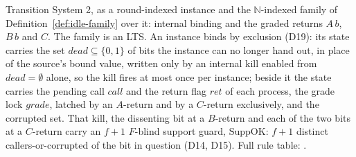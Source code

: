 \begin{definition}
  \label{def:aba-gbca-spec}
  \leanok
  Transition System 2, as a round-indexed instance and the $\mathbb{N}$-indexed family of Definition~\ref{def:idle-family} over it: internal binding and the graded returns $A\,b$, $B\,b$ and $C$.
  The family is an LTS.\leanok{}
  An instance binds by exclusion (D19): its state carries the set $dead \subseteq \{0,1\}$ of bits the instance can no longer hand out, in place of the source's bound value, written only by an internal kill enabled from $dead = \emptyset$ alone, so the kill fires at most once per instance; beside it the state carries the pending call $call$ and the return flag $ret$ of each process, the grade lock $grade$, latched by an $A$-return and by a $C$-return exclusively, and the corrupted set.
  That kill, the dissenting bit at a $B$-return and each of the two bits at a $C$-return carry an $f{+}1$ $F$-blind support guard, $\mathrm{SuppOK}$: $f{+}1$ distinct callers-or-corrupted of the bit in question (D14, D15).
  Full rule table: .
\end{definition}
